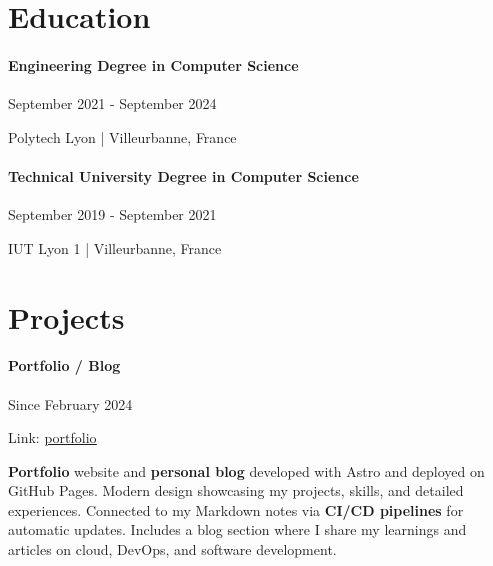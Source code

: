 \documentclass{article}
\begin{document}
\vspace{2ex}
\hrulefill
\section*{Education}
\paragraph{Engineering Degree in Computer Science}\hspace*{\fill}September 2021 - September 2024

Polytech Lyon | Villeurbanne, France


\paragraph{Technical University Degree in Computer Science}\hspace*{\fill}September 2019 - September 2021

IUT Lyon 1 | Villeurbanne, France

\vspace{2ex}
\hrulefill
\section*{Projects}

\paragraph{Portfolio / Blog} \hspace*{\fill}Since February 2024

Link: \href{https://issamsisbane.github.io/portfolio/en/}{\underline{portfolio}}

\vspace{\baselineskip}

\textbf{Portfolio} website and \textbf{personal blog} developed with Astro and deployed on GitHub Pages. Modern design showcasing my projects, skills, and detailed experiences. Connected to my Markdown notes via \textbf{CI/CD pipelines} for automatic updates. Includes a blog section where I share my learnings and articles on cloud, DevOps, and software development.
\end{document}
